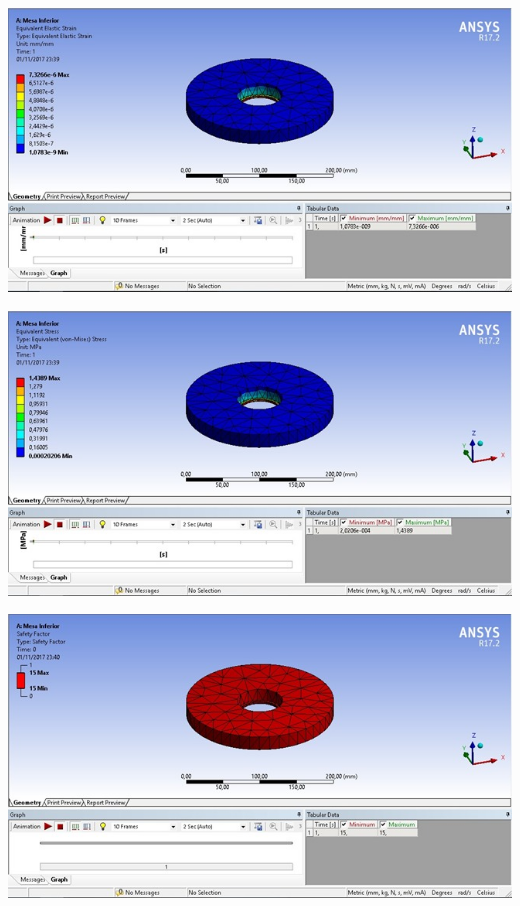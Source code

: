     \begin{center}
    	\includegraphics[scale=0.7]{figuras/sim_estatica_2}
        \label{sim_estatica_2}
    \end{center}
    
    \begin{center}
    	\includegraphics[scale=0.7]{figuras/stress_2}
        \label{stress_2}
    \end{center}
    
    \begin{center}
    	\includegraphics[scale=0.7]{figuras/fator_seguranca_2}
        \label{fator_seguranca_2}
    \end{center}
    
